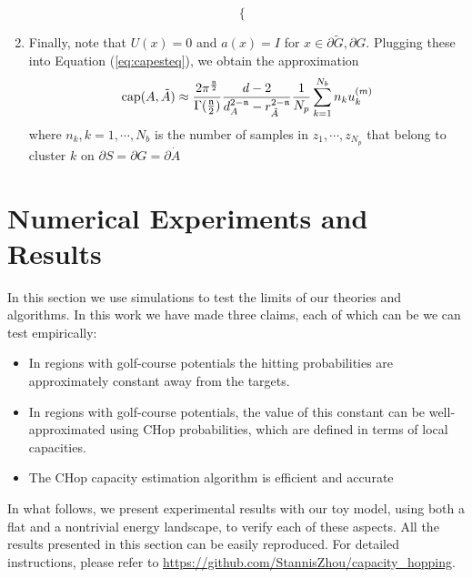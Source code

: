 \documentclass[english, aip, jcp, priprint, graphicx,floatfix]{revtex4-1}
\theoremstyle{plain}
\theoremstyle{definition}
\theoremstyle{plain}
\begin{document}
\begin{enumerate}
\[\begin{cases}
\end{cases}
\]
\item Finally, note that $U (x) = 0$ and $a (x) = I$ for $x
\in \partial \tilde{G},\partial G$.  Plugging these into Equation (\ref{eq:capesteq}), we obtain the approximation
%
\begin{gather}
	\operatorname{cap} (A, \tilde{A}) \approx \frac{2\pi^{\frac{{\mathfrak{n}}}{2}}}{\Gamma(\frac{{\mathfrak{n}}}{2})}\frac{d-2}{d_A^{2-{\mathfrak{n}}}-r_{\tilde A}^{2-{\mathfrak{n}}}}\frac{1}{N_p} \sum_{k=1}^{N_b}n_k u_k^{(m)}
\end{gather}
where $n_k, k=1, \cdots, N_b$ is the number of samples in $z_1, \cdots, z_{N_p}$ that belong to cluster $k$ on $\partial S=\partial G=\partial \dot{A}$
%
\end{enumerate}


                                     

\section{Numerical Experiments and Results}\label{sec:experiments}

In this section we use simulations to test the limits of our theories and algorithms.  In this work we have made three claims, each of which can be we can test empirically:

\begin{itemize}
\item In regions with golf-course potentials the hitting probabilities are approximately constant away from the targets.
\item In regions with golf-course potentials, the value of this constant can be well-approximated using CHop probabilities, which are defined in terms of local capacities.
\item The CHop capacity estimation algorithm is efficient and accurate
\end{itemize}

In what follows, we present experimental results with our toy model, using both a flat and a nontrivial energy landscape, to verify each of these aspects.  All the results presented in this section can be easily reproduced. For detailed instructions, please refer to \url{https://github.com/StannisZhou/capacity_hopping}.
\end{document}
